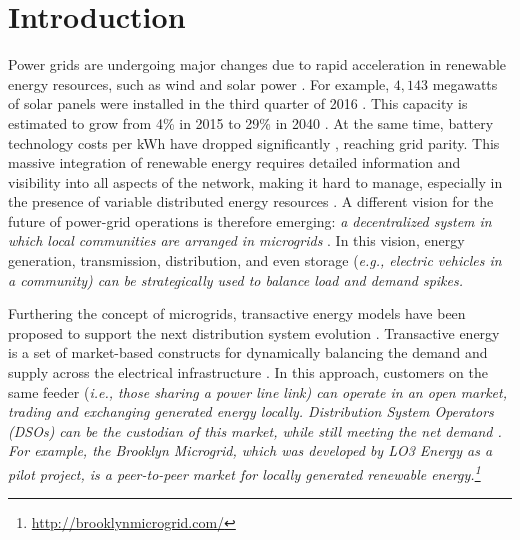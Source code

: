\section{Introduction}


Power grids are undergoing major changes due to rapid
acceleration in renewable energy resources, such as wind and solar power \cite{5430489}. 
For example, $4,\!143$ megawatts of solar panels were installed in the
third quarter of 2016 \cite{seia}. This capacity is estimated to grow
from 4\% in 2015 to 29\% in 2040 \cite{Randal}. At the same time,
battery technology costs per kWh have dropped significantly
\cite{stock2015powerful}, reaching grid parity.
This massive integration of renewable energy requires detailed
information and visibility into all aspects of the network, making it
hard to manage, especially in the presence of variable distributed
energy resources \cite{7452738}. A different vision for the future of
power-grid operations is therefore emerging: {\em a decentralized
  system in which local communities are arranged in microgrids}
\cite{rahimi2012transactive}. In this vision, energy generation,
transmission, distribution, and even storage (\em{e.g.}, electric
vehicles in a community) can be strategically used to balance load and
demand spikes.

Furthering the concept of microgrids, transactive energy models have
been proposed to support the next distribution system evolution
\cite{kok2016society,cox2013structured,melton2013gridwise}. Transactive
energy is a set of market-based constructs for dynamically balancing
the demand and supply across the electrical infrastructure
\cite{melton2013gridwise}. In this approach, customers on the same
feeder (\em{i.e.}, those sharing a power line link) can operate in an
open market, trading and exchanging generated energy
locally. Distribution System Operators (DSOs) can be the custodian of
this market, while still meeting the net demand \cite{7462854}. For
example, the Brooklyn Microgrid, which was developed by LO3 Energy as
a pilot project, is a peer-to-peer market for locally generated
renewable energy.\footnote{\url{http://brooklynmicrogrid.com/}}

